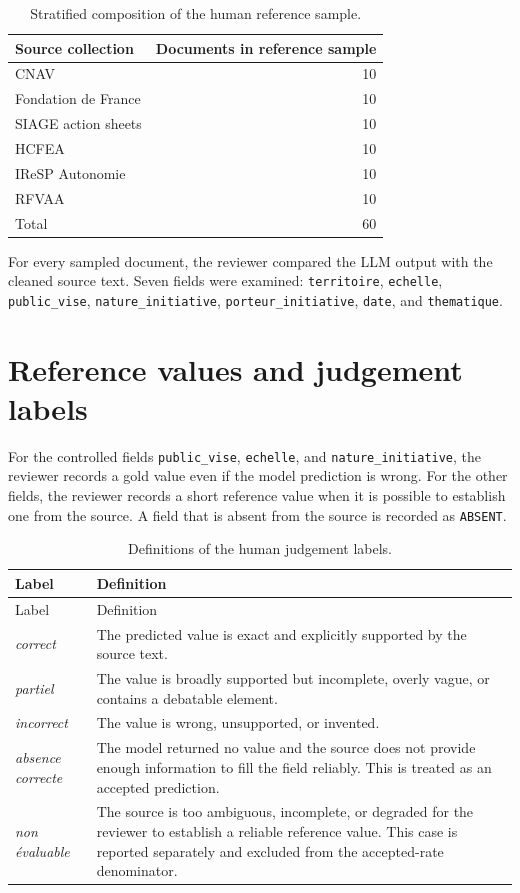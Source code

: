 \documentclass[
11pt,
english,
singlespacing,
headsepline,
]{MastersDoctoralThesis}
\begin{document}
\begin{table}[H]
\centering
\begin{tabular}{lr}
\toprule
Source collection & Documents in reference sample \\
\midrule
CNAV & 10 \\
Fondation de France & 10 \\
SIAGE action sheets & 10 \\
HCFEA & 10 \\
IReSP Autonomie & 10 \\
RFVAA & 10 \\
\midrule
Total & 60 \\
\bottomrule
\end{tabular}
\caption{Stratified composition of the human reference sample.}
\label{tab:appendix-evaluation-sample}
\end{table}

For every sampled document, the reviewer compared the LLM output with the
cleaned source text. Seven fields were examined: \texttt{territoire},
\texttt{echelle}, \texttt{public\_vise}, \texttt{nature\_initiative},
\texttt{porteur\_initiative}, \texttt{date}, and \texttt{thematique}.

\section{Reference values and judgement labels}

For the controlled fields \texttt{public\_vise}, \texttt{echelle}, and
\texttt{nature\_initiative}, the reviewer records a gold value even if the
model prediction is wrong. For the other fields, the reviewer records a short
reference value when it is possible to establish one from the source. A field
that is absent from the source is recorded as \texttt{ABSENT}.

\begin{longtable}{p{3cm}p{11cm}}
\caption{Definitions of the human judgement labels.}
\label{tab:appendix-judgement-labels}\\
\toprule
Label & Definition \\
\midrule
\endfirsthead
\toprule
Label & Definition \\
\midrule
\endhead
\bottomrule
\endfoot
\textit{correct} & The predicted value is exact and explicitly supported by the source text. \\
\textit{partiel} & The value is broadly supported but incomplete, overly vague, or contains a debatable element. \\
\textit{incorrect} & The value is wrong, unsupported, or invented. \\
\textit{absence correcte} & The model returned no value and the source does not provide enough information to fill the field reliably. This is treated as an accepted prediction. \\
\textit{non évaluable} & The source is too ambiguous, incomplete, or degraded for the reviewer to establish a reliable reference value. This case is reported separately and excluded from the accepted-rate denominator. \\
\end{longtable}
\end{document}
